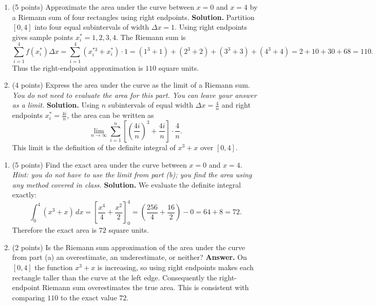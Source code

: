 \documentclass[12pt]{article}
\begin{document}
\begin{enumerate}[label=(\alph*)]
    \item (5 points) Approximate the area under the curve between $x=0$ and $x=4$ by a Riemann sum of four rectangles using right endpoints.
    {\color{blue}\textbf{Solution.} Partition $[0,4]$ into four equal subintervals of width $\Delta x=1$. Using right endpoints gives sample points $x_i^*=1,2,3,4$. The Riemann sum is
    \[
        \sum_{i=1}^{4} f(x_i^*)\Delta x=\sum_{i=1}^4 (x_i^{*3}+x_i^*)\cdot 1=(1^3+1)+(2^3+2)+(3^3+3)+(4^3+4)=2+10+30+68=110.
    \]
    Thus the right-endpoint approximation is $110$ square units.}
    
    \item (4 points) Express the area under the curve as the limit of a Riemann sum.
    \textit{You do not need to evaluate the area for this part. You can leave your answer as a limit.}
    {\color{blue}\textbf{Solution.} Using $n$ subintervals of equal width $\Delta x=\frac{4}{n}$ and right endpoints $x_i^*=\frac{4i}{n}$, the area can be written as
    \[
        \lim_{n\to\infty}\sum_{i=1}^{n}\left[\left(\frac{4i}{n}\right)^3+\frac{4i}{n}\right]\cdot\frac{4}{n}.
    \]
    This limit is the definition of the definite integral of $x^3+x$ over $[0,4]$.}
    
\end{enumerate}

\newpage

\begin{enumerate}[label=(\alph*)]\addtocounter{enumi}{2} %
    \item (5 points) Find the exact area under the curve between $x=0$ and $x=4$.
    \textit{Hint: you do not have to use the limit from part (b); you find the area using any method covered in class.}
    {\color{blue}\textbf{Solution.} We evaluate the definite integral exactly:
    \[
        \int_0^4 (x^3+x)\,dx=\left[\frac{x^4}{4}+\frac{x^2}{2}\right]_0^4=\left(\frac{256}{4}+\frac{16}{2}\right)-0=64+8=72.
    \]
    Therefore the exact area is $72$ square units.}
    
    \item (2 points) Is the Riemann sum approximation of the area under the curve from part (a) an overestimate, an underestimate, or neither?
    {\color{blue}\textbf{Answer.} On $[0,4]$ the function $x^3+x$ is increasing, so using right endpoints makes each rectangle taller than the curve at the left edge. Consequently the right-endpoint Riemann sum overestimates the true area. This is consistent with comparing $110$ to the exact value $72$.}
    
\end{enumerate}
\end{document}
